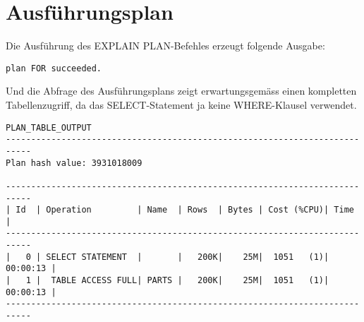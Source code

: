\documentclass[11pt,a4paper,parskip=half]{scrartcl}
\begin{document}
\section{Ausführungsplan}
Die Ausführung des EXPLAIN PLAN-Befehles erzeugt folgende Ausgabe:
\begin{lstlisting}
plan FOR succeeded.
\end{lstlisting}

Und die Abfrage des Ausführungsplans zeigt erwartungsgemäss einen kompletten Tabellenzugriff, da das SELECT-Statement ja keine WHERE-Klausel verwendet.
\begin{lstlisting}
PLAN_TABLE_OUTPUT                                                                                                                                                                                                                                                                                          
---------------------------------------------------------------------------
Plan hash value: 3931018009                                                                                                                                                                                                                                                                                  
                                                                                                                                                                                                                                                                                                             
---------------------------------------------------------------------------                                                                                                                                                                                                                                  
| Id  | Operation         | Name  | Rows  | Bytes | Cost (%CPU)| Time     |                                                                                                                                                                                                                                  
---------------------------------------------------------------------------                                                                                                                                                                                                                                  
|   0 | SELECT STATEMENT  |       |   200K|    25M|  1051   (1)| 00:00:13 |                                                                                                                                                                                                                                  
|   1 |  TABLE ACCESS FULL| PARTS |   200K|    25M|  1051   (1)| 00:00:13 |                                                                                                                                                                                                                                  
---------------------------------------------------------------------------     
\end{lstlisting}
\end{document}
